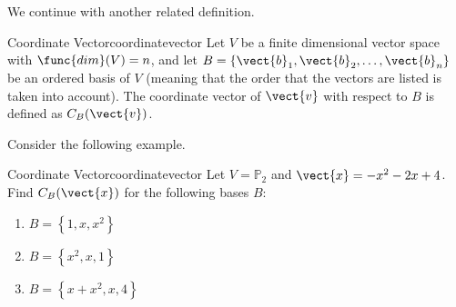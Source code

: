 We continue with another related definition.

\begin{definition}{Coordinate Vector}{coordinatevector}
Let $V$ be a finite dimensional vector space with $\func{dim}(V)=n$, and
let $B=\{\vect{b}_1, \vect{b}_2, \ldots, \vect{b}_n\}$ be an ordered basis of $V$ (meaning that the order that the
vectors are listed is taken into account).
The coordinate vector of $\vect{v}$ with respect to $B$ is defined
as $C_B(\vect{v})$.
\end{definition}

Consider the following example.

\begin{example}{Coordinate Vector}{coordinatevector}
Let $V = \mathbb{P}_2$ and $\vect{x} = -x^2 -2x + 4$. 
Find $C_B(\vect{x})$ for the following bases $B$:
\begin{enumerate}
\item $B = \left\{ 1, x, x^2 \right\}$
\item $B = \left\{ x^2, x, 1 \right\}$
\item $B = \left\{ x + x^2 , x , 4 \right\}$
\end{enumerate}
\end{example}

